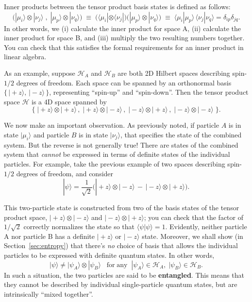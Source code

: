 \documentclass[pra,11pt]{revtex4}
\begin{document}
Inner products between the tensor product basis states is defined as follows:
$$\Big(|\mu_i\rangle \otimes |\nu_j\rangle\;,\; |\mu_p\rangle \otimes |\nu_q\rangle \Big) \;\equiv\; \Big(\langle\mu_i| \otimes \langle\nu_j| \Big) \Big(|\mu_p\rangle \otimes |\nu_q\rangle\Big) \;\equiv\; \langle\mu_i|\mu_p\rangle \, \langle\nu_j|\nu_q\rangle = \delta_{ip}\delta_{jq}.$$
In other words, we (i) calculate the inner product for space A, (ii)
calculate the inner product for space B, and (iii) multiply the two
resulting numbers together.  You can check that this satisfies the
formal requirements for an inner product in linear algebra.

As an example, suppose $\mathscr{H}_A$ and $\mathscr{H}_B$ are both 2D
Hilbert spaces describing spin-$1/2$ degrees of freedom.  Each space
can be spanned by an orthonormal basis $\{\,|\!+\!z\rangle,
\,|\!-\!z\rangle \, \}$, representing ``spin-up'' and ``spin-down''.
Then the tensor product space $\mathscr{H}$ is a 4D space spanned by
$$\Big\{\;|\!+\!z\rangle\otimes|\!+\!z\rangle\,,\; |\!+\!z\rangle\otimes|\!-\!z\rangle\,,\; |\!-z\!\rangle\otimes|\!+\!z\rangle\,,\; |\!-\!z\rangle\otimes|\!-\!z\rangle \;\Big\}.$$

We now make an important observation.  As previously noted, if
particle $A$ is in state $|\mu_i\rangle$ and particle $B$ is in state
$|\nu_j\rangle$, that specifies the state of the combined system.  But
the reverse is not generally true!  There are states of the combined
system that \textit{cannot} be expressed in terms of definite states
of the individual particles.  For example, take the previous example
of two spaces describing spin-$1/2$ degrees of freedom, and consider
$$|\psi\rangle = \frac{1}{\sqrt{2}} \Big(|\!+\!z\rangle\otimes|\!-\!z\rangle \,-\, |\!-z\!\rangle\otimes|\!+\!z\rangle\Big).$$

This two-particle state is constructed from two of the basis states of
the tensor product space, $|\!+\!z\rangle\otimes|\!-\!z\rangle$ and
$|\!-\!z\rangle\otimes|\!+\!z\rangle$; you can check that the factor
of $1/\sqrt{2}$ correctly normalizes the state so that
$\langle\psi|\psi\rangle = 1$.  Evidently, neither particle A nor
particle B has a definite $|\!+\!z\rangle$ or $|\!-\!z\rangle$ state.
Moreover, we shall show (in Section~\ref{sec:entropy}) that there's
\textit{no} choice of basis that allows the individual particles to be
expressed with definite quantum states.  In other words,
$$|\psi\rangle \ne |\psi_A\rangle\otimes|\psi_B\rangle \;\;\;\textrm{for}\;\textrm{any}\;\; |\psi_A\rangle \in \mathscr{H}_A, \;|\psi_B\rangle \in \mathscr{H}_B.$$
In such a situation, the two particles are said to be
\textbf{entangled}.  This means that they cannot be described by
individual single-particle quantum states, but are intrinsically
``mixed together''.
\end{document}
